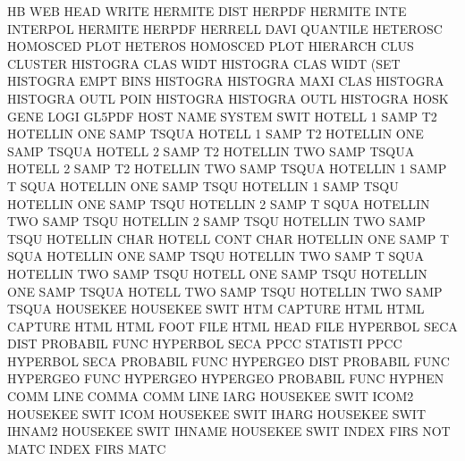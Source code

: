 HB                                      WEB
HEAD                                    WRITE
HERMITE  DIST                           HERPDF
HERMITE  INTE                           INTERPOL
HERMITE                                 HERPDF
HERRELL  DAVI                           QUANTILE
HETEROSC                                HOMOSCED PLOT
HETEROS                                 HOMOSCED PLOT
HIERARCH CLUS                           CLUSTER
HISTOGRA CLAS WIDT                      HISTOGRA CLAS WIDT (SET
HISTOGRA EMPT BINS                      HISTOGRA
HISTOGRA MAXI CLAS                      HISTOGRA
HISTOGRA OUTL POIN                      HISTOGRA
HISTOGRA OUTL                           HISTOGRA
HOSK     GENE LOGI                      GL5PDF
HOST     NAME                           SYSTEM   SWIT
HOTELL   1    SAMP T2                   HOTELLIN ONE  SAMP TSQUA
HOTELL   1    SAMP T2                   HOTELLIN ONE  SAMP TSQUA
HOTELL   2    SAMP T2                   HOTELLIN TWO  SAMP TSQUA
HOTELL   2    SAMP T2                   HOTELLIN TWO  SAMP TSQUA
HOTELLIN 1    SAMP T    SQUA            HOTELLIN ONE  SAMP TSQU
HOTELLIN 1    SAMP TSQU                 HOTELLIN ONE  SAMP TSQU
HOTELLIN 2    SAMP T    SQUA            HOTELLIN TWO  SAMP TSQU
HOTELLIN 2    SAMP TSQU                 HOTELLIN TWO  SAMP TSQU
HOTELLIN CHAR                           HOTELL   CONT CHAR
HOTELLIN ONE  SAMP T    SQUA            HOTELLIN ONE  SAMP TSQU
HOTELLIN TWO  SAMP T    SQUA            HOTELLIN TWO  SAMP TSQU
HOTELL   ONE  SAMP TSQU                 HOTELLIN ONE  SAMP TSQUA
HOTELL   TWO  SAMP TSQU                 HOTELLIN TWO  SAMP TSQUA
HOUSEKEE                                HOUSEKEE SWIT
HTM                                     CAPTURE  HTML
HTML                                    CAPTURE  HTML
HTML     FOOT FILE                      HTML     HEAD FILE
HYPERBOL SECA DIST                      PROBABIL FUNC
HYPERBOL SECA PPCC                      STATISTI PPCC
HYPERBOL SECA                           PROBABIL FUNC
HYPERGEO DIST                           PROBABIL FUNC
HYPERGEO FUNC                           HYPERGEO
HYPERGEO                                PROBABIL FUNC
HYPHEN   COMM LINE                      COMMA    COMM LINE
IARG                                    HOUSEKEE SWIT
ICOM2                                   HOUSEKEE SWIT
ICOM                                    HOUSEKEE SWIT
IHARG                                   HOUSEKEE SWIT
IHNAM2                                  HOUSEKEE SWIT
IHNAME                                  HOUSEKEE SWIT
INDEX    FIRS NOT  MATC                 INDEX    FIRS MATC
